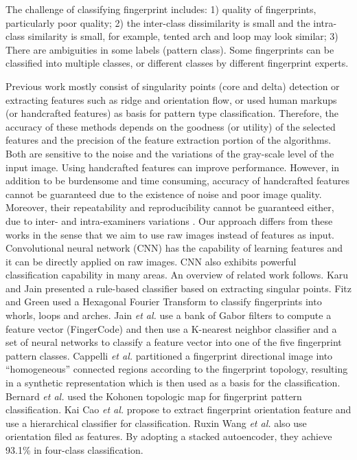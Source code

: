 
The challenge of classifying fingerprint includes: 
%
1) quality of fingerprints, particularly poor quality; 
%
2) the inter-class dissimilarity is small and the intra-class similarity is small, for example, tented arch and loop may look similar; 
%
3) There are ambiguities in some labels (pattern class). Some fingerprints can be classified into multiple classes, or different classes by different fingerprint experts.

Previous work mostly consist of singularity points (core and delta) detection or extracting features such as ridge and orientation flow, or used human markups (or handcrafted features) as basis for pattern type classification. Therefore, the accuracy of these methods depends on the goodness (or utility) of the selected features and the precision of the feature extraction portion of the algorithms. Both are sensitive to the noise and the variations of the gray-scale level of the input image.  Using handcrafted features can improve performance.  However, in addition to be burdensome and time consuming, accuracy of handcrafted features cannot be guaranteed due to the existence of noise and poor image quality. Moreover, their repeatability and reproducibility cannot be guaranteed either, due to inter- and intra-examiners variations \cite{fbiBlackbox}.  
%
Our approach differs from these works in the sense that we aim to use raw images instead of features as input. Convolutional neural network (CNN) has the capability of learning features and it can be directly applied on raw images. CNN also exhibits powerful classification capability in many areas\cite{lecun2015deep}\cite{szegedy2016rethinking}.
%
An overview of related work follows. 
%
Karu and Jain \cite{karuJain1996} presented a rule-based classifier based on extracting singular points. 
%
Fitz and Green \cite{FitzGreen1996} used a Hexagonal Fourier Transform to classify fingerprints into whorls, loops and arches. 
%
Jain \textit{et al.} \cite{JainSalil1999} use a bank of Gabor filters to compute a feature vector (FingerCode) and then use a K-nearest neighbor classifier and a set of neural networks to classify a feature vector into one of the five fingerprint pattern classes.
%
Cappelli \textit{et al.} \cite{cappelli1999} partitioned a fingerprint directional image into ``homogeneous'' connected regions according to the fingerprint topology, resulting in a synthetic representation which is then used as a basis for the classification.
%
 Bernard \textit{et al.} \cite{Bernard2001} used the Kohonen topologic map for fingerprint pattern classification. 
%
Kai Cao \textit{et al.}\cite{cao2013fingerprint} propose to extract fingerprint orientation feature and use a hierarchical classifier for classification.
%
Ruxin Wang \textit{et al.} \cite{wang2014fingerprint} also use orientation filed as features. By adopting a stacked autoencoder, they achieve 93.1\% in four-class classification.
 
